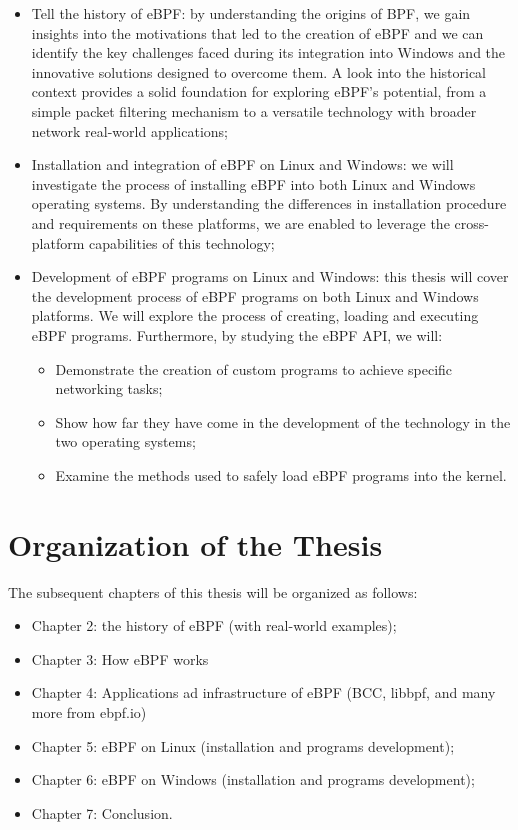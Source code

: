\begin{itemize}
	\item 
		Tell the history of eBPF: by understanding the origins of BPF, we gain insights into the motivations that led to the creation of eBPF and we can identify the key challenges faced during its integration into Windows and the innovative solutions designed to overcome them. 
		A look into the historical context provides a solid foundation for exploring eBPF's potential, from a simple packet filtering mechanism to a versatile technology with broader network real-world applications;
	\item 
		Installation and integration of eBPF on Linux and Windows: we will investigate the process of installing eBPF into both Linux and Windows operating systems. 
		By understanding the differences in installation procedure and requirements on these platforms, we are enabled to leverage the cross-platform capabilities of this technology;
	\item 
		Development of eBPF programs on Linux and Windows: this thesis will cover the development process of eBPF programs on both Linux and Windows platforms. 
		We will explore the process of creating, loading and executing eBPF programs.
		Furthermore, by studying the eBPF API, we will:
		\begin{itemize}
			\item 
				Demonstrate the creation of custom programs to achieve specific networking tasks;
			\item 
				Show how far they have come in the development of the technology in the two operating systems;
			\item 
				Examine the methods used to safely load eBPF programs into the kernel. 
		\end{itemize}
\end{itemize}

\section{Organization of the Thesis}


The subsequent chapters of this thesis will be organized as follows:

\begin{itemize}
	\item 
		Chapter 2: the history of eBPF (with real-world examples);
	\item 
		Chapter 3: How eBPF works
	\item 
		Chapter 4: Applications ad infrastructure of eBPF (BCC, libbpf, and many more from ebpf.io)
	\item 
		Chapter 5: eBPF on Linux (installation and programs development);
	\item 
		Chapter 6: eBPF on Windows (installation and programs development);
	\item 
		Chapter 7: Conclusion.
\end{itemize}


